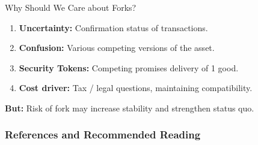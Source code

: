 \documentclass[handout]{beamer}
\begin{document}
\begin{frame}{Why Should We Care about Forks?}


\begin{enumerate}
	\item \textbf{Uncertainty:} Confirmation status of transactions.
	\item \textbf{Confusion:} Various competing versions of the asset.
	\item \textbf{Security Tokens:} Competing promises delivery of 1 good.
	\item \textbf{Cost driver:} Tax / legal questions, maintaining compatibility.
\end{enumerate}

\vspace{1em}
\color{focus} \textbf{But:} \color{black} Risk of fork may increase stability and strengthen status quo.

	
\end{frame}

\begin{frame}%
\frametitle{References and Recommended Reading}

	
	

\end{frame}
\end{document}
